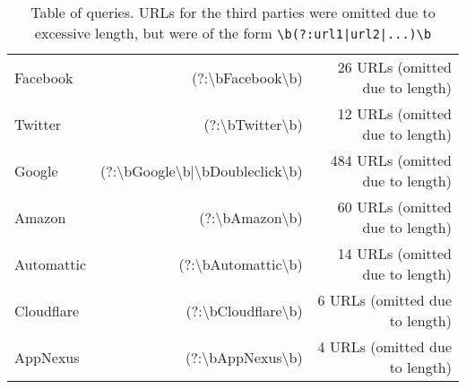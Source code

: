 \begin{table*}[t]
{\begin{tabular}{lrr}
Facebook                   & (?:\textbackslash{}bFacebook\textbackslash{}b)                                                                                                              & 26 URLs (omitted due to length)                                                                                         \\
Twitter                    & (?:\textbackslash{}bTwitter\textbackslash{}b)                                                                                                               & 12 URLs (omitted due to length)                                                                                         \\
Google                     & (?:\textbackslash{}bGoogle\textbackslash{}b|\textbackslash{}bDoubleclick\textbackslash{}b)                                                                  & 484 URLs (omitted due to length)                                                                                        \\
Amazon                     & (?:\textbackslash{}bAmazon\textbackslash{}b)                                                                                                                & 60 URLs (omitted due to length)                                                                                         \\
Automattic                 & (?:\textbackslash{}bAutomattic\textbackslash{}b)                                                                                                            & 14 URLs (omitted due to length)                                                                                         \\
Cloudflare                 & (?:\textbackslash{}bCloudflare\textbackslash{}b)                                                                                                            & 6 URLs (omitted due to length)                                                                                          \\
AppNexus                   & (?:\textbackslash{}bAppNexus\textbackslash{}b)                                                                                                              & 4 URLs (omitted due to length)          \\                                  
\end{tabular}
}
\caption{Table of queries. URLs for the third parties were omitted due to excessive length, but were of the form \texttt{\textbackslash{}b(?:url1|url2|...)\textbackslash{}b} }
\label{tbl:queries}
\end{table*}
\fi
